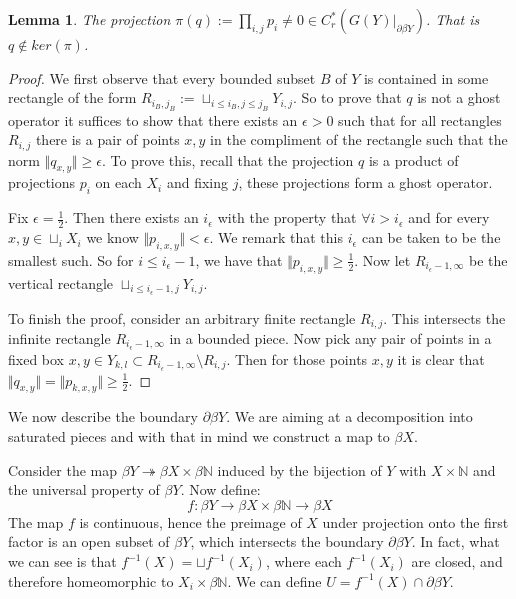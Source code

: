 \documentclass[11pt]{amsart}
\theoremstyle{plain}
\newtheorem{lemma}[theorem]{Lemma}%
\theoremstyle{definition}%
\theoremstyle{remark}%
\begin{document}
\begin{lemma}\label{Lem:nag}
The projection $\pi(q):= \prod_{i,j}p_{i} \not = 0 \in C^{*}_{r}(G(Y)|_{\partial\beta Y})$. That is $q \not\in ker(\pi)$.
\end{lemma}
\begin{proof}
We first observe that every bounded subset $B$ of $Y$ is contained in some rectangle of the form $R_{i_{B},j_{B}}:=\sqcup_{i\leq i_{B},j\leq j_{B}}Y_{i,j}$. So to prove that $q$ is not a ghost operator it suffices to show that there exists an $\epsilon>0$ such that for all rectangles $R_{i,j}$ there is a pair of points $x,y$ in the compliment of the rectangle such that  the norm $\Vert q_{x,y} \Vert \geq \epsilon$. To prove this, recall that the projection $q$ is a product of projections $p_{i}$ on each $X_{i}$ and fixing $j$, these projections form a ghost operator. 

Fix $\epsilon = \frac{1}{2}$. Then there exists an $i_{\epsilon}$ with the property that $\forall i>i_{\epsilon}$ and for every $x,y \in \sqcup_{i}X_{i}$ we know $\Vert p_{i,x,y} \Vert < \epsilon$. We remark that this $i_{\epsilon}$ can be taken to be the smallest such. So for $i \leq i_{\epsilon}-1$, we have that $\Vert p_{i,x,y} \Vert \geq \frac{1}{2}$. Now let $R_{i_{\epsilon}-1,\infty}$ be the vertical rectangle $\sqcup_{i\leq i_{\epsilon}-1,j} Y_{i,j}$. 

To finish the proof, consider an arbitrary finite rectangle $R_{i,j}$. This intersects the infinite rectangle $R_{i_{\epsilon}-1,\infty}$ in a bounded piece. Now pick any pair of points in a fixed box $x,y \in Y_{k,l} \subset R_{i_{\epsilon}-1,\infty} \setminus R_{i,j}$. Then for those points $x,y$ it is clear that $\Vert q_{x,y} \Vert = \Vert p_{k,x,y}\Vert \geq \frac{1}{2}$.
\end{proof}

We now describe the boundary $\partial\beta Y$. We are aiming at a decomposition into saturated pieces and with that in mind we construct a map to $\beta X$.

Consider the map $\beta Y \twoheadrightarrow \beta X \times \beta \mathbb{N}$ induced by the bijection of $Y$ with $X \times \mathbb{N}$ and the universal property of $\beta Y$. Now define:
\begin{equation*}
f: \beta Y \rightarrow \beta X \times \beta \mathbb{N} \rightarrow \beta X
\end{equation*}
The map $f$ is continuous, hence the preimage of $X$ under projection onto the first factor is an open subset of $\beta Y$, which intersects the boundary $\partial \beta Y$. In fact, what we can see is that $f^{-1}(X)= \sqcup f^{-1}(X_{i})$, where each $f^{-1}(X_{i})$ are closed, and therefore homeomorphic to $X_{i} \times \beta \mathbb{N}$. We can define $U = f^{-1}(X)\cap \partial\beta Y$.
\end{document}
